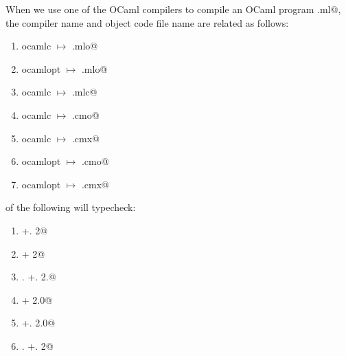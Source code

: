 \documentclass[addpoints,11pt]{exam}
\begin{document}
\begin{questions}
\begin{enumerate}
\end{enumerate}\question When we use one of the OCaml compilers to compile an OCaml program \lstinline@program.ml@, the compiler name and object code file name are related as follows:
\begin{enumerate}
\item ocamlc $\mapsto$ \lstinline@program.mlo@
\item ocamlopt $\mapsto$ \lstinline@program.mlo@
\item ocamlc $\mapsto$ \lstinline@program.mlc@
\item ocamlc $\mapsto$ \lstinline@program.cmo@
\item ocamlc $\mapsto$ \lstinline@program.cmx@
\item ocamlopt $\mapsto$ \lstinline@program.cmo@
\item ocamlopt $\mapsto$ \lstinline@program.cmx@
\end{enumerate}\question of the following will typecheck:
\begin{enumerate}
\item {} +. 2@
\item {} + 2@
\item {}. +. 2.@
\item {} + 2.0@
\item {} +. 2.0@
\item {}. +. 2@
\end{enumerate}\end{questions}
\end{document}

